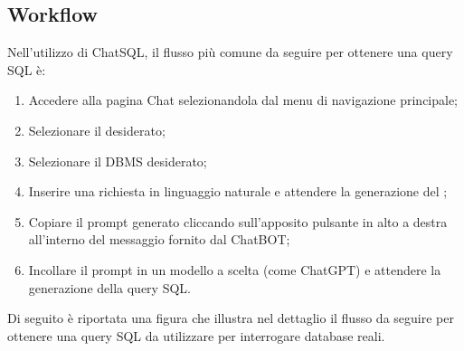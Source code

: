 \subsection{Workflow}
\par Nell'utilizzo di ChatSQL, il flusso più comune da seguire per ottenere una query SQL è:
\begin{enumerate}
  \item Accedere alla pagina Chat selezionandola dal menu di navigazione principale;
  \item Selezionare il  desiderato;
  \item Selezionare il DBMS desiderato;
  \item Inserire una richiesta in linguaggio naturale e attendere la generazione del ;
  \item Copiare il prompt generato cliccando sull'apposito pulsante in alto a destra all'interno del messaggio fornito dal ChatBOT;
  \item Incollare il prompt in un modello  a scelta (come ChatGPT) e attendere la generazione della query SQL.
\end{enumerate}

\vspace{0.5\baselineskip}
\par Di seguito è riportata una figura che illustra nel dettaglio il flusso da seguire per ottenere una query SQL da utilizzare per interrogare database reali.

